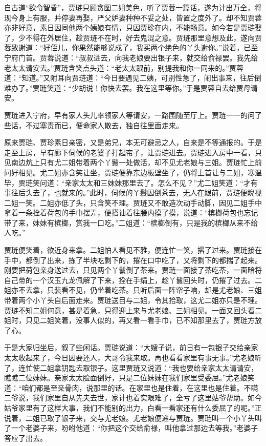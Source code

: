 自古道“欲令智昏”，贾琏只顾贪图二姐美色，听了贾蓉一篇话，遂为计出万全，将现今身上有服，并停妻再娶，严父妒妻种种不妥之处，皆置之度外了。却不知贾蓉亦非好意，素日因同他两个姨娘有情，只因贾珍在内，不能畅意。如今若是贾琏娶了，少不得在外居住，趁贾琏不在时，好去鬼混之意。贾琏那里意想及此，遂向贾蓉致谢道：“好侄儿，你果然能够说成了，我买两个绝色的丫头谢你。”说着，已至宁府门首。贾蓉说道：“叔叔进去，向我老娘要出银子来，就交给俞禄罢。我先给老太太请安去。”贾琏含笑点头道：“老太太跟前，别提我和你一同来的。”贾蓉道：“知道。”又附耳向贾琏道：“今日要遇见二姨，可别性急了，闹出事来，往后倒难办了。”贾琏笑道：“少胡说！你快去罢。我在这里等你。”于是贾蓉自去给贾母请安。

贾琏进入宁府，早有家人头儿率领家人等请安，一路围随至厅上。贾琏一一的问了些话，不过塞责而已，便命家人散去，独自往里面走来。

原来贾琏、贾珍素日亲密，又是弟兄，本无可避忌之人，自来是不等通报的。于是走至上房，早有廊下伺候的老婆子打起帘子，让贾琏进去。贾琏进入房中一看，只见南边炕上只有尤二姐带着两个丫鬟一处做活，却不见尤老娘与三姐。贾琏忙上前问好相见。尤二姐亦含笑让坐，贾琏便靠东边板壁坐了，仍将上首让与二姐，寒温毕，贾琏笑问道：“亲家太太和三妹妹那里去了。怎么不见？”尤二姐笑道：“才有事往后头去了，也就来的。”此时，伺候的丫鬟因倒茶去，无人在跟前，贾琏便睨视二姐一笑。二姐亦低了头，只含笑不理。贾琏又不敢造次动手动脚，因见二姐手中拿着一条拴着荷包的手巾摆弄，便搭讪着往腰内摸了摸，说道：“槟榔荷包也忘记带了来，妹妹有槟榔，赏我一口吃。”二姐道：“槟榔倒有，只是我的槟榔从来不给人吃。”

贾琏便笑着，欲近身来拿。二姐怕人看见不雅，便连忙一笑，撂了过来。贾琏接在手中，都倒了出来，拣了半块吃剩下的，撂在口中吃了，又将剩下的都揣了起来。刚要把荷包亲身送过去，只见两个丫鬟倒了茶来。贾琏一面接了茶吃茶，一面暗将自己带的一个汉玉九龙佩解了下来，拴在手绢上，趁丫鬟回头时，仍撂了过去。二姐亦不去拿，只装看不见，仍坐着吃茶。只听后面一阵帘子响，却是尤老娘、三姐带着两个小丫头自后面走来。贾琏送目与二姐，令其拾取，这尤二姐亦只是不理。贾琏不知二姐何意，甚是着急，只得迎上来与尤老娘、三姐相见。一面又回头看二姐时，只见二姐笑着，没事人似的，再又看一看手巾，已不知那里去了，贾琏方放了心。

于是大家归坐后，叙了些闲话。贾琏说道：“大嫂子说，前日有一包银子交给亲家太太收起来了，今日因要还人，大哥令我来取。再也看看家里有事无事。”尤老娘听了，连忙使二姐拿钥匙去取银子。这里贾琏又说道：“我也要给亲家太太请请安，瞧瞧二位妹妹。亲家太太脸面倒好，只是二位妹妹在我们家里受委屈。”尤老娘笑道：“咱们都是至亲骨肉，说那里的话。在家里也是住着，在这里也是住着。不瞒二爷说，我们家里自从先夫去世，家计也着实艰难了，全亏了这里姑爷帮助。如今姑爷家里有了这样大事，我们不能别的出力，白看一看家还有什么委屈了的呢。”正说着，二姐已取了银子来，交与尤老娘。尤老娘便递与贾琏。贾琏叫一个小丫头叫了一个老婆子来，吩咐他道：“你把这个交给俞禄，叫他拿过那边去等我。”老婆子答应了出去。

